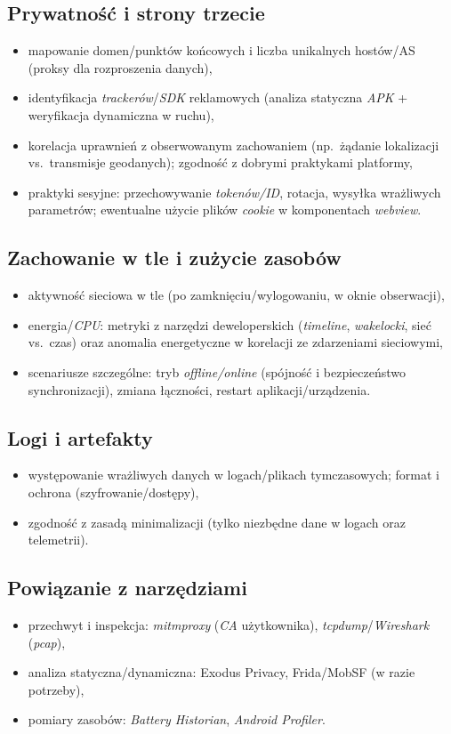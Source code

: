 \subsection{Prywatność i strony trzecie}
\begin{itemize}
  \item mapowanie domen/punktów końcowych i liczba unikalnych hostów/AS (proksy dla rozproszenia danych),
  \item identyfikacja \emph{trackerów}/\emph{SDK} reklamowych (analiza statyczna \emph{APK} + weryfikacja dynamiczna w ruchu),
  \item korelacja uprawnień z obserwowanym zachowaniem (np.\ żądanie lokalizacji vs.\ transmisje geodanych); zgodność z dobrymi praktykami platformy,
  \item praktyki sesyjne: przechowywanie \emph{tokenów/ID}, rotacja, wysyłka wrażliwych parametrów; ewentualne użycie plików \emph{cookie} w komponentach \emph{webview}.
\end{itemize}

\subsection{Zachowanie w tle i zużycie zasobów}
\begin{itemize}
  \item aktywność sieciowa w tle (po zamknięciu/wylogowaniu, w oknie obserwacji),
  \item energia/\emph{CPU}: metryki z narzędzi deweloperskich (\emph{timeline}, \emph{wakelocki}, sieć vs.\ czas) oraz anomalia energetyczne w korelacji ze zdarzeniami sieciowymi,
  \item scenariusze szczególne: tryb \emph{offline/online} (spójność i bezpieczeństwo synchronizacji), zmiana łączności, restart aplikacji/urządzenia.
\end{itemize}

\subsection{Logi i artefakty}
\begin{itemize}
  \item występowanie wrażliwych danych w logach/plikach tymczasowych; format i ochrona (szyfrowanie/dostępy),
  \item zgodność z zasadą minimalizacji (tylko niezbędne dane w logach oraz telemetrii).
\end{itemize}

\subsection{Powiązanie z narzędziami}
\begin{itemize}
  \item przechwyt i inspekcja: \emph{mitmproxy} (\emph{CA} użytkownika), \emph{tcpdump}/\emph{Wireshark} (\emph{pcap}),
  \item analiza statyczna/dynamiczna: Exodus Privacy, Frida/MobSF (w razie potrzeby),
  \item pomiary zasobów: \emph{Battery Historian}, \emph{Android Profiler}.
\end{itemize}


